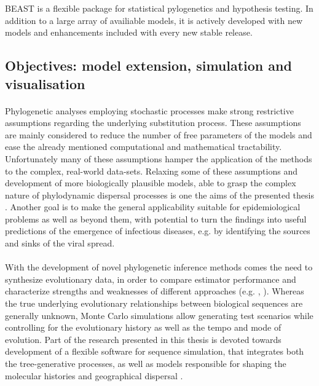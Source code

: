 BEAST is a flexible package for statistical pylogenetics and hypothesis testing.
In addition to a large array of availiable models, it is actively developed with new models and enhancements included with every new stable release.

\subsection{Objectives: model extension, simulation and visualisation\label{sub:objectives}}

\paragraph{}
Phylogenetic analyses employing stochastic processes make strong restrictive assumptions regarding the underlying substitution process.
These assumptions are mainly considered to reduce the number of free parameters of the models and ease the already mentioned computational and mathematical tractability.
Unfortunately many of these assumptions hamper the application of the methods to the complex, real-world data-sets.
Relaxing some of these assumptions and development of more biologically plausible models, able to grasp the complex nature of phylodynamic dispersal processes is one the aims of the presented thesis \citep{Bielejec2014a}.
Another goal is to make the general applicability suitable for epidemiological problems as well as beyond them, with potential to turn the findings into useful predictions of the emergence of infectious diseases, e.g. by identifying the sources and sinks of the viral spread.

\paragraph{}
With the development of novel phylogenetic inference methods comes the need to synthesize evolutionary data, in order to compare estimator performance and characterize strengths and weaknesses of different approaches (e.g. \cite{Arenas2012}, \cite{Hoban2011}).
Whereas the true underlying evolutionary relationships between biological sequences are generally unknown, Monte Carlo simulations allow generating test scenarios while controlling for the evolutionary history as well as the tempo and mode of evolution. 
Part of the research presented in this thesis is devoted towards development of a flexible software for sequence simulation, that integrates both the tree-generative processes, as well as models responsible for shaping the molecular histories and geographical dispersal \citep{Bielejec2014a}.

